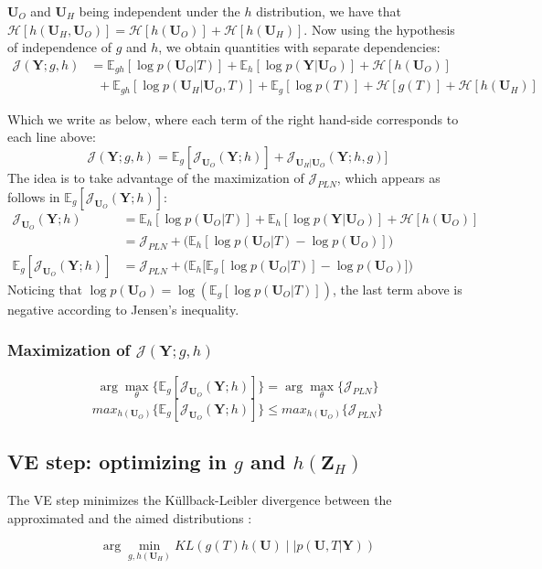 \documentclass[11pt,a4paper]{article}
\newcommand{\argmin}{\arg\!\min}
\newcommand{\argmax}{\arg\!\max}
\newcommand{\entr}{\mathcal{H}}
\newcommand{\Ybf}{\boldsymbol{Y}}
\newcommand{\Zbf}{\boldsymbol{Z}}
\newcommand{\Ubf}{\boldsymbol{U}}
\newcommand{\Esp}{\mathds{E}}
\begin{document}
 $\Ubf_O$ and $\Ubf_H$ being independent under the $h$ distribution, we have that $\entr[h(\Ubf_H,\Ubf_O)] =\entr[h(\Ubf_O)] +\entr[h(\Ubf_H)]$. Now using the hypothesis of independence of $g$ and $h$, we obtain quantities with separate dependencies:
\begin{align}
\mathcal{J}(\Ybf; g,h)&=  \Esp_{gh}[\log p(\Ubf_O | T)] +\Esp_h[\log p(\Ybf|\Ubf_O)]+\entr[h(\Ubf_O)]  \label{PLNlike}\\
& \;\; + \Esp_{gh}[\log p(\Ubf_H | \Ubf_O,T) ]+\Esp_g[\log p(T)] +\entr[g(T)]+\entr[h(\Ubf_H)] \label{new}
\end{align}

Which we write as below, where each term of the right hand-side corresponds to each line above:
$$\mathcal{J}(\Ybf; g,h)= \Esp_g[\mathcal{J}_{\Ubf_O}(\Ybf;h)] + \mathcal{J}_{\Ubf_H|\Ubf_O}(\Ybf;h,g)]$$
The idea is to take advantage of the maximization of  $\mathcal{J}_{PLN}$, which appears as follows in $\Esp_g[\mathcal{J}_{\Ubf_O}(\Ybf;h)] $:
\begin{align*}
\mathcal{J}_{\Ubf_O}(\Ybf;h) &= \Esp_h[\log p(\Ubf_O|T)] + \Esp_h[\log p(\Ybf|\Ubf_O)]+\entr[h(\Ubf_O)]\\
&= \mathcal{J}_{PLN} + \big(\Esp_h[\log p(\Ubf_O|T)-\log p(\Ubf_O) ]\big)\\
\Esp_g[\mathcal{J}_{\Ubf_O}(\Ybf;h)] &= \mathcal{J}_{PLN} + \Big(\Esp_h\big[\Esp_g[\log p(\Ubf_O|T)]-\log p(\Ubf_O) \big]\Big)
\end{align*}
Noticing that $\log p(\Ubf_O) = \log (\Esp_g[ \log p(\Ubf_O|T)])$, the last term above is negative according to Jensen's inequality.

 \subsubsection{Maximization of $\mathcal{J}(\Ybf; g,h)$}

$$\argmax_{\theta}\Big\{\Esp_g[\mathcal{J}_{\Ubf_O}(\Ybf;h)]\Big\} = \argmax_{\theta}\Big\{\mathcal{J}_{PLN}\Big\} $$
$$ max_{h(\Ubf_O)}\Big\{\Esp_g[\mathcal{J}_{\Ubf_O}(\Ybf;h)]\Big\} \leq  max_{h(\Ubf_O)}\Big\{\mathcal{J}_{PLN}\Big\} $$

\subsection{VE step: optimizing in $g$ and $h(\Zbf_H)$}
The VE step minimizes the Küllback-Leibler divergence between the approximated and the aimed distributions :

$$  \argmin_{g,h(\Ubf_H)} KL\left(g(T)h(\Ubf) \mid\mid p(\Ubf,T|\Ybf)\right)$$
\end{document}
